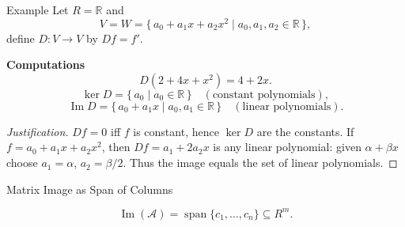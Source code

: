 \documentclass[11pt,aspectratio=43,ignorenonframetext,t]{beamer}
\begin{document}
\begin{frame}{Example}
\vspace{-0.3cm}
Let $R=\mathbb{R}$ and
\[
V=W=\{\, a_0+a_1 x+a_2 x^2 \mid a_0,a_1,a_2\in\mathbb{R}\,\},
\]
define $D:V\to V$ by $Df=f'$.

\textbf{Computations}
\[
D(2+4x+x^2)=4+2x.
\]
\[
\ker D=\{\, a_0 \mid a_0\in\mathbb{R}\,\} \quad (\text{constant polynomials}),
\]
\[
\operatorname{Im} D=\{\, a_0+a_1 x \mid a_0,a_1\in\mathbb{R}\,\} \quad (\text{linear polynomials}).
\]


\begin{proof}[Justification]
$Df=0$ iff $f$ is constant, hence $\ker D$ are the constants. If $f=a_0+a_1x+a_2 x^2$, then $Df=a_1+2a_2 x$ is any linear polynomial: given $\alpha+\beta x$ choose $a_1=\alpha$, $a_2=\beta/2$. Thus the image equals the set of linear polynomials.
\end{proof}
\end{frame}


\begin{frame}{Matrix Image as Span of Columns}

\begin{center}
\end{center}
\[
\operatorname{Im}(\mathcal A)=\operatorname{span}\{c_1,\dots,c_n\}\subseteq R^m.
\]
\end{frame}
\end{document}

